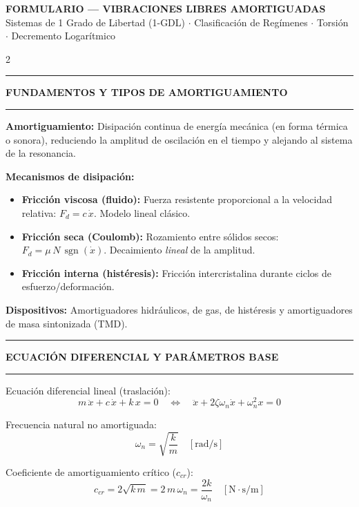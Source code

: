 \documentclass[10pt,a4paper]{article}
\newcommand{\seccion}[1]{%
  \vspace{1.5mm}\hrule\vspace{1mm}%
  \textbf{\footnotesize\MakeUppercase{#1}}\vspace{1mm}\hrule\vspace{1.5mm}}
\begin{document}
\small

\begin{center}
  \textbf{\large FORMULARIO — VIBRACIONES LIBRES AMORTIGUADAS} \\
  \vspace{0.6mm}
  \footnotesize Sistemas de 1 Grado de Libertad (1-GDL) $\cdot$ Clasificación de Regímenes $\cdot$ Torsión $\cdot$ Decremento Logarítmico
\end{center}
\vspace{-3mm}

\begin{multicols}{2}

\seccion{Fundamentos y Tipos de Amortiguamiento}

\textbf{Amortiguamiento:} Disipación continua de energía mecánica (en forma térmica o sonora), reduciendo la amplitud de oscilación en el tiempo y alejando al sistema de la resonancia.

\textbf{Mecanismos de disipación:}
\begin{itemize}\setlength{\itemsep}{0pt}\setlength{\parskip}{0pt}
  \item \textbf{Fricción viscosa (fluido):} Fuerza resistente proporcional a la velocidad relativa: $F_d = c\,\dot{x}$. Modelo lineal clásico.
  \item \textbf{Fricción seca (Coulomb):} Rozamiento entre sólidos secos: $F_d = \mu\,N\,\operatorname{sgn}(\dot{x})$. Decaimiento \textit{lineal} de la amplitud.
  \item \textbf{Fricción interna (histéresis):} Fricción intercristalina durante ciclos de esfuerzo/deformación.
\end{itemize}

\textbf{Dispositivos:} Amortiguadores hidráulicos, de gas, de histéresis y amortiguadores de masa sintonizada (TMD).

\seccion{Ecuación diferencial y parámetros base}

Ecuación diferencial lineal (traslación):
\begin{equation*}
  m\,\ddot{x} + c\,\dot{x} + k\,x = 0
  \quad\Longleftrightarrow\quad
  \ddot{x} + 2\zeta\omega_n\dot{x} + \omega_n^{2}x = 0
\end{equation*}

Frecuencia natural no amortiguada:
\begin{equation*}
  \omega_n = \sqrt{\frac{k}{m}} \quad [\mathrm{rad/s}]
\end{equation*}

Coeficiente de amortiguamiento crítico ($c_{cr}$):
\begin{equation*}
  c_{cr} = 2\sqrt{k\,m} = 2\,m\,\omega_n = \frac{2k}{\omega_n} \quad [\mathrm{N\cdot s/m}]
\end{equation*}


\end{multicols}
\end{document}
